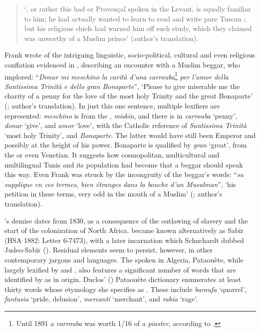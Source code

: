 \documentclass[output=paper]{langsci/langscibook}
\begin{document}
	\begin{quote}
		‘, or rather this bad  or Provençal spoken in the Levant, is equally familiar to him; he had actually wanted to learn to read and write  pure Tuscan ; but his religious chiefs had warned him off such study, which they claimed was unworthy of a Muslim prince’ (author's translation).
	\end{quote}
	
	Frank wrote of the intriguing linguistic, socio-political, cultural and even religious conflation evidenced in , describing an encounter with a Muslim beggar, who implored: “\textit{Donar mi meschino la carità d’una carrouba}\footnote{Until 1891 a \textit{carrouba} was worth 1/16 of a  \textit{piaster}, according to \citet{Rossetti1999}.} \textit{per l’amor della Santissima Trinità e dello gran Bonaparte}”, ‘Please to give miserable me the charity of a penny for the love of the most holy Trinity and the great Bonaparte’ (\citealt[101]{Frank1850}; author's translation). In just this one  sentence, multiple lexifiers are represented: \textit{meschino} is from the , \textit{miskīn}, and there is  in \textit{carrouba} ‘penny’, \textit{donar} ‘give’, and \textit{amor} ‘love’, with the  Catholic reference of \textit{Santissima Trinità} ‘most holy Trinity’, and  \textit{Bonaparte}. The latter would have still been Emperor and possibly at the height of his power. Bonaparte is qualified by \textit{gran} ‘great’, from the  or even Venetian. It suggests how cosmopolitan, multicultural and multilingual Tunis and its population had become that a beggar should speak this way. Even Frank was struck by the incongruity of the beggar’s words: ``\textit{sa supplique en ces termes, bien étranges dans la bouche d’un Musulman}'', ‘his petition in these terms, very odd in the mouth of a Muslim’ (\citealt[101]{Frank1850}; author's translation).
	
	’s demise dates from 1830, as a consequence of the outlawing of slavery and the start of the  colonization of North Africa.  became known alternatively as Sabir (HSA 1882: Letter 6-7473), with a later incarnation which Schuchardt dubbed Judeo-Sabir (\citealt[87]{Schuchardt1909}). Residual elements seem to persist, however, in other contemporary jargons and languages. The  spoken in Algeria, Pataouète, while largely lexified by  and , also features a significant number of words that are identified by \citet{Lanly1962} as  in origin. Duclos’ (\citeyear{Duclos1992}) Pataouète dictionary enumerates at least thirty words whose etymology she specifies as . These include \textit{baroufa} ‘quarrel', \textit{fantasia} ‘pride, delusion’, \textit{mercanti} ‘merchant’, and \textit{rabia} ‘rage’.
	
\end{document}
